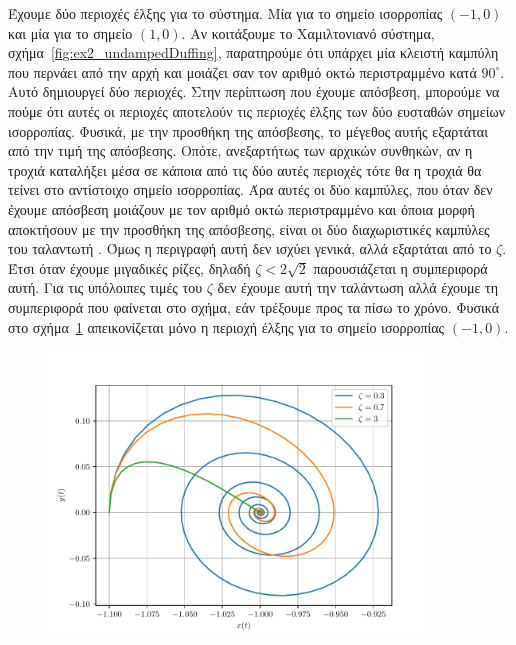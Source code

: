 \begin{solution}
    Έχουμε δύο περιοχές έλξης για το σύστημα. Μία για το σημείο ισορροπίας
    \( (-1, 0) \) και μία για το σημείο \( (1, 0) \). Αν κοιτάξουμε το
    Χαμιλτονιανό σύστημα, σχήμα~\ref{fig:ex2_undampedDuffing}, παρατηρούμε ότι
    υπάρχει μία κλειστή καμπύλη που περνάει από την αρχή και μοιάζει σαν τον αριθμό
    οκτώ περιστραμμένο κατά \( 90^{\circ} \). Αυτό δημιουργεί δύο περιοχές. Στην
    περίπτωση που έχουμε απόσβεση, μπορούμε να πούμε ότι αυτές οι περιοχές
    αποτελούν τις περιοχές έλξης των δύο ευσταθών σημείων ισορροπίας. Φυσικά, με
    την προσθήκη της απόσβεσης, το μέγεθος αυτής εξαρτάται από την τιμή της
    απόσβεσης. Οπότε, ανεξαρτήτως των αρχικών συνθηκών, αν η τροχιά καταλήξει
    μέσα σε κάποια από τις δύο αυτές περιοχές τότε θα η τροχιά θα τείνει στο
    αντίστοιχο σημείο ισορροπίας. Άρα αυτές οι δύο καμπύλες, που όταν δεν έχουμε
    απόσβεση μοιάζουν με τον αριθμό οκτώ περιστραμμένο και όποια μορφή
    αποκτήσουν με την προσθήκη της απόσβεσης, είναι οι δύο διαχωριστικές
    καμπύλες του ταλαντωτή . Όμως η περιγραφή αυτή δεν ισχύει γενικά,
    αλλά εξαρτάται από το \( \zeta \). Έτσι όταν έχουμε μιγαδικές ρίζες, δηλαδή
    \( \zeta < 2\sqrt{2} \) παρουσιάζεται η συμπεριφορά αυτή. Για τις υπόλοιπες τιμές
    του \( \zeta \) δεν έχουμε αυτή την ταλάντωση αλλά έχουμε τη συμπεριφορά που
    φαίνεται στο σχήμα, εάν τρέξουμε προς τα πίσω το χρόνο. Φυσικά στο
    σχήμα~\ref{fig:ex2_attractors} απεικονίζεται μόνο η περιοχή έλξης για το σημείο
    ισορροπίας \( (-1, 0) \).
    \begin{figure}[h!]
        \centering
        \includegraphics[width=0.9\textwidth]{figures/ex2_attractors.pdf}
        \caption{}
        \label{fig:ex2_attractors}
    \end{figure}


\end{solution}
